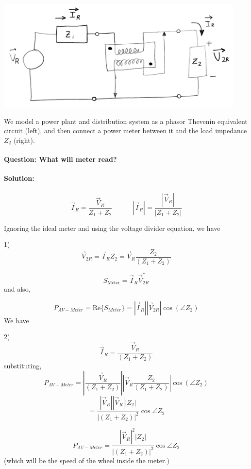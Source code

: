 \begin{Example}


\includegraphics[width=125mm]{figsChapt03/GD42554.png}



We model a power plant and distribution system as a phasor Thevenin equivalent
circuit (left), and then connect a power meter between it and the load impedance $Z_2$
(right).

\vspace{0.2in}
\paragraph{Question: What will meter read?}

\paragraph{Solution:}
\[
\vec{I}_R = \frac{\vec{V}_R}{Z_1 + Z_2} \quad\quad\quad |\vec{I}_R| = \frac{|\vec{V}_R|}{| {Z}_1 +  {Z}_2|}
\]

Ignoring the ideal meter and using the voltage divider equation, we have

\hspace {1.75in} 1)
\[
\vec{V}_{2R} = \vec{I}_R Z_2 = \vec V_R \frac{Z_2}{(Z_1 + Z_2)}
\]

\[
S_{\text{Meter}} = \vec{I}_R\vec{V}_{2R}^*
\]
and also,

\[
P_{AV-Meter} = \mathrm{Re} \{S_{Meter}\} = |\vec I_R||\vec V_{2R}|\cos(\angle Z_2)
\]
We have


\hspace {1.75in} 2)
\[
\vec I_R = \frac {\vec V_{R}} {(Z_1+Z_2)}
\]
substituting,
\[
P_{AV-Meter} = \left |   \frac {\vec V_{R}}   {(Z_1+Z_2)}   \right |
\left | \vec V_R \frac{Z_2}{(Z_1 + Z_2)} \right | \cos(\angle Z_2)
\]
\[
= \frac{|\vec{V}_R| |\vec{V}_R| |Z_2|}
       {|(Z_1 + Z_2)|^2} \cos \angle Z_2
\]

\[\boxed{
P_{AV-Meter} = \frac{|\vec{V}_R|^2 |Z_2|}
                    {|(Z_1 + Z_2)|^2} \cos \angle Z_2
}
\]
(which will be the speed of the wheel inside the meter.)

\end{Example}










